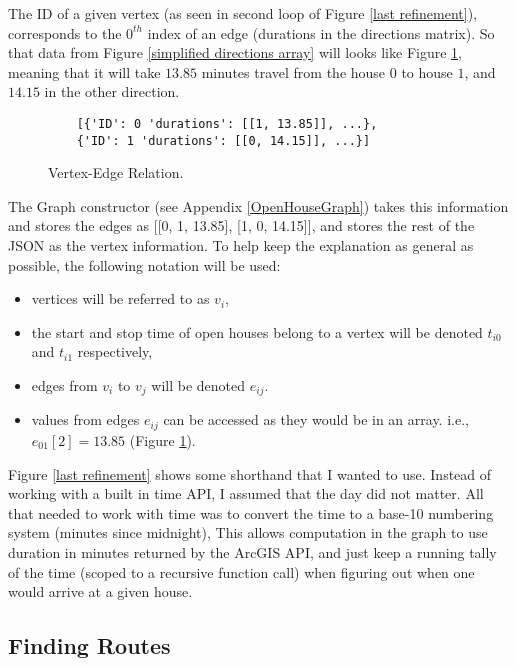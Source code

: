 \documentclass[letterpaper,11pt]{report}
\theoremstyle{definition}
\theoremstyle{definition}
\def\ie{{i.e.,}\ }
\begin{document}
The \textsf{ID} of a given vertex (as seen in second loop of Figure \ref{last refinement}), corresponds to the $0^{th}$ index of an \textsf{edge} (\textsf{durations} in the directions matrix). So that data from Figure \ref{simplified directions array} will looks like Figure \ref{vertex edge relation}, meaning that it will take $13.85$ minutes travel from the house $0$ to house $1$, and $14.15$ in the other direction.
\begin{figure}[!htb]
  \begin{lstlisting}
    [{'ID': 0 'durations': [[1, 13.85]], ...}, 
    {'ID': 1 'durations': [[0, 14.15]], ...}]
  \end{lstlisting}
  \caption{Vertex-Edge Relation.}\label{vertex edge relation}
\end{figure}

The \textsf{Graph} constructor (see Appendix \ref{OpenHouseGraph}) takes this information and stores the edges as [[0, 1, 13.85], [1, 0, 14.15]], and stores the rest of the JSON as the vertex information. To help keep the explanation as general as possible, the following notation will be used:
\begin{itemize}
  \item vertices will be referred to as $v_i$,
  \item the start and stop time of open houses belong to a vertex will be denoted $t_{i0}$ and $t_{i1}$ respectively,
  \item edges from $v_i$ to $v_j$ will be denoted $e_{ij}$.
  \item values from edges $e_{ij}$ can be accessed as they would be in an array. \ie $e_{01}[2] = 13.85$ (Figure \ref{vertex edge relation}).
\end{itemize}

Figure \ref{last refinement} shows some shorthand that I wanted to use. Instead of working with a built in time API, I assumed that the day did not matter. All that needed to work with time was to convert the time to a base-10 numbering system (minutes since midnight), This allows computation in the graph to use duration in minutes returned by the ArcGIS API, and just keep a running tally of the time (scoped to a recursive function call) when figuring out when one would arrive at a given house.
 
\subsection{Finding Routes}
\end{document}
